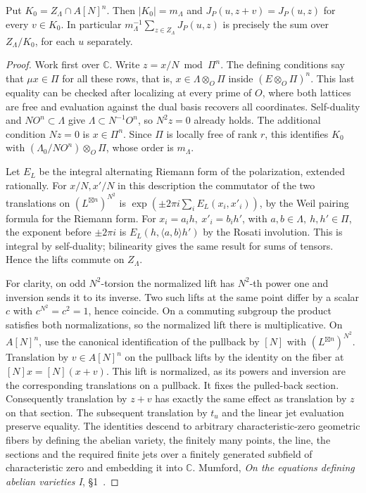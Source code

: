 \begin{lemma}\label{newtheta:index}
Put \(K_0=Z_\Lambda\cap A[N]^n\). Then \(|K_0|=m_\Lambda\) and
\(J_P(u,z+v)=J_P(u,z)\) for every \(v\in K_0\). In particular
\(m_\Lambda^{-1}\sum_{z\in Z_\Lambda}J_P(u,z)\) is precisely
the sum over \(Z_\Lambda/K_0\), for each \(u\) separately.
\end{lemma}
\begin{proof}
Work first over \(\mathbb C\). Write \(z=x/N\bmod\Pi^n\).
The defining conditions say that \(\mu x\in\Pi\) for all these
rows, that is, \(x\in\Lambda\otimes_O\Pi\) inside
\((E\otimes_O\Pi)^n\). This last equality can be checked after
localizing at every prime of \(O\), where both lattices are free
and evaluation against the dual basis recovers all coordinates.
Self-duality and \(NO^n\subset\Lambda\) give
\(\Lambda\subset N^{-1}O^n\), so \(N^2z=0\) already holds.
The additional condition \(Nz=0\) is \(x\in\Pi^n\).
Since \(\Pi\) is locally free of rank \(r\), this identifies \(K_0\)
with \((\Lambda_0/NO^n)\otimes_O\Pi\), whose order is \(m_\Lambda\).

Let \(E_L\) be the integral alternating Riemann form of the
polarization, extended rationally. For \(x/N,x'/N\) in this
description the commutator of the two translations on
\((L^{\boxtimes n})^{N^2}\) is
\(\exp(\pm2\pi i\sum_i E_L(x_i,x'_i))\), by the Weil pairing
formula for the Riemann form. For \(x_i=a_i h,\ x'_i=b_i h'\),
with \(a,b\in\Lambda,\ h,h'\in\Pi\), the exponent before
\(\pm2\pi i\) is \(E_L(h,\langle a,b\rangle h')\) by the
Rosati involution. This is integral by self-duality; bilinearity
gives the same result for sums of tensors. Hence the lifts commute
on \(Z_\Lambda\).

For clarity, on odd \(N^2\)-torsion the normalized lift has
\(N^2\)-th power one and inversion sends it to its inverse.
Two such lifts at the same point differ by a scalar \(c\) with
\(c^{N^2}=c^2=1\), hence coincide. On a commuting subgroup the
product satisfies both normalizations, so the normalized lift there
is multiplicative. On \(A[N]^n\), use the canonical identification
of the pullback by \([N]\) with \((L^{\boxtimes n})^{N^2}\).
Translation by \(v\in A[N]^n\) on the pullback lifts by the
identity on the fiber at \([N]x=[N](x+v)\). This lift is
normalized, as its powers and inversion are the corresponding
translations on a pullback. It fixes the pulled-back section.
Consequently translation by \(z+v\) has exactly the same effect
as translation by \(z\) on that section. The subsequent translation
by \(t_u\) and the linear jet evaluation preserve equality.
The identities descend to arbitrary characteristic-zero geometric
fibers by defining the abelian variety, the finitely many points,
the line, the sections and the required finite jets over a finitely
generated subfield of characteristic zero and embedding it into
\(\mathbb C\). Mumford,
\emph{On the equations defining abelian varieties I}, \S1~\cite{mumfordEquations}.
\end{proof}

